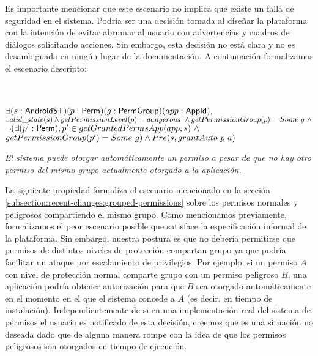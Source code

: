 Es importante mencionar que este escenario no implica que existe un falla de seguridad en el
sistema. Podría ser una decisión tomada al diseñar la plataforma con la intención de evitar abrumar
al usuario con advertencias y cuadros de diálogos solicitando acciones. Sin embargo, esta decisión
no está clara y no es desambiguada en ningún lugar de la documentación. A continuación formalizamos
el escenario descripto:

\begin{prop} \label{section:formalization:property2} \mbox{} \\ \\
    $\exists (s:\mathsf{AndroidST}) (p:\mathsf{Perm}) (g:\mathsf{PermGroup}) (app:\mathsf{AppId}),$ $valid\_state(s) \land \\
        getPermissionLevel(p) = dangerous~ \land getPermissionGroup(p) = Some\ g\ \land$ $\neg
        (\exists (p': \mathsf{Perm}), p' \in getGrantedPermsApp(app,s)~ \land$ \\
    $ getPermissionGroup(p') = Some\ g) \land Pre(s, grantAuto~p~a) \\ \\$

    \textit{El sistema puede otorgar automáticamente un permiso a pesar de que no hay otro permiso del mismo grupo actualmente otorgado a la aplicación.}
\end{prop}


La siguiente propiedad formaliza el escenario mencionado en la sección
\ref{subsection:recent-changes:grouped-permissions} sobre los permisos normales y peligrosos
compartiendo el  mismo grupo. Como mencionamos previamente, formalizamos el peor escenario posible
que satisface la especificación informal de la plataforma. Sin embargo, nuestra postura es que no
debería permitirse que permisos de distintos niveles de protección compartan grupo ya que podría
facilitar un ataque por escalamiento de privilegios. Por ejemplo, si un permiso $A$ con nivel de
protección normal comparte grupo con un permiso peligroso $B$, una aplicación podría obtener
autorización para que $B$ sea otorgado automáticamente en el momento en el que el sistema concede a
$A$ (es decir, en tiempo de instalación). Independientemente de si en una implementación real del
sistema de permisos el usuario es notificado de esta decisión, creemos que es una situación no
deseada dado que de alguna manera rompe con la idea de que los permisos peligrosos son otorgados en
tiempo de ejecución.


